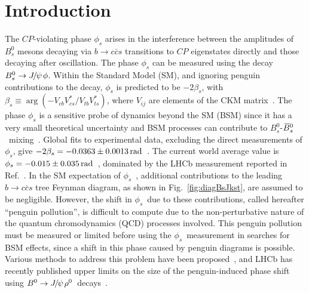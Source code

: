 \documentclass[12pt,a4paper]{article}
\newcommand{\CP}{\ensuremath{{C\!P}}\xspace}
\def\PJ      {\ensuremath{J}\xspace}
\newcommand{\rad}{\ensuremath{\rm \,rad}\xspace}
\def\CP                {\ensuremath{C\!P}\xspace}
\def\Ppsi {\ensuremath{\psi}\xspace}
\def\jpsi     {{\ensuremath{{\PJ\mskip -3mu/\mskip -2mu\Ppsi\mskip 2mu}}}\xspace}
\def\Bbar    {\kern 0.18em\overline{\kern -0.18em B}{}\xspace}
\newcommand{\Bs}{\ensuremath{B^0_s}\xspace}
\def\Bsb     {\ensuremath{\Bbar^0_s}\xspace}
\newcommand{\Bd}{\ensuremath{B^0}\xspace}
\newcommand{\BsJpsiPhi}{\ensuremath{B^0_s\to \jpsi \phi}\xspace}
\newcommand{\phis}{\ensuremath{\phi_s}\xspace}
\newcommand{\figref}[1]{Fig.~\ref{#1}}
\begin{document}
\newpage
\setcounter{page}{2}
\mbox{~}

\cleardoublepage







 
\renewcommand{\thefootnote}{\arabic{footnote}}
\setcounter{footnote}{0}



\pagestyle{plain} \setcounter{page}{1}

\section{Introduction}
\label{sec:intro}

The \CP-violating phase \phis arises in the interference between the  amplitudes of \Bs mesons decaying via $b\to c\bar{c}s$ transitions to \CP eigenstates directly and those decaying after  oscillation.
The phase \phis can be measured using the decay \BsJpsiPhi. 
Within the Standard Model (SM), and ignoring penguin contributions to the decay, \phis is predicted to be $-2\beta_s$, with \mbox{$\beta_s \equiv  \arg (-V_{cb}V_{cs}^*/V_{tb}V_{ts}^*)$,} where $V_{ij}$ are elements of the CKM matrix~\cite{Kobayashi:1973fv}. 
The phase \phis is a sensitive probe of dynamics beyond the SM (BSM) since it 
has a very small theoretical uncertainty and BSM processes can contribute to \Bs-\Bsb\ mixing~\cite{Altmannshofer:2009ne,Altmannshofer:2007cs,Buras:2009if,Chiang:2009ev}.
Global fits to experimental data, excluding the direct measurements of \phis, give \mbox{$-2\beta_s = -0.0363 \pm 0.0013\rad$~\cite{Charles:2015gya}.}
 The current world average value is $\phis = -0.015 \pm 0.035\rad$~\cite{HFAG}, dominated by the LHCb measurement reported in Ref.~\cite{LHCb-PAPER-2014-059}.
In the SM expectation of \phis~\cite{Charles:2015gya}, additional contributions to the leading $b\to c\bar{c}s$ tree Feynman diagram, as shown in \figref{fig:diagBsJkst}, are assumed to be negligible. However, the shift in \phis\ due to these contributions, called hereafter ``penguin pollution'', is difficult to compute due to the non-perturbative nature of the quantum chromodynamics (QCD) processes involved. This penguin pollution
must be measured or limited before using the \phis\ measurement in searches for BSM effects, since a shift in this phase caused by penguin diagrams is
possible. Various methods to address this problem have been
proposed~\cite{Fleischer:1999zi, Fleischer:2006rk, Faller:2008gt, Liu:2013nea, DeBruyn:2014oga, Frings:2015eva}, and LHCb has recently
published upper limits on the size of the penguin-induced phase shift using $\Bd\to \jpsi \rho^0$\ decays~\cite{LHCb-PAPER-2014-058}.
\end{document}
